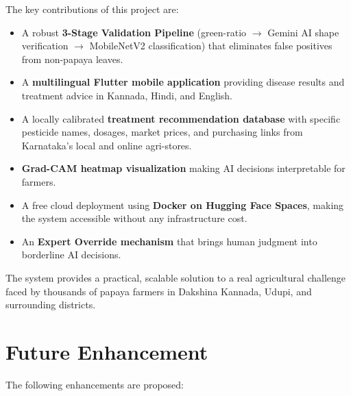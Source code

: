 \documentclass[12pt,a4paper]{report}
\begin{document}
The key contributions of this project are:
\begin{itemize}
    \item A robust \textbf{3-Stage Validation Pipeline} (green-ratio $\rightarrow$ Gemini AI shape verification $\rightarrow$ MobileNetV2 classification) that eliminates false positives from non-papaya leaves.
    \item A \textbf{multilingual Flutter mobile application} providing disease results and treatment advice in Kannada, Hindi, and English.
    \item A locally calibrated \textbf{treatment recommendation database} with specific pesticide names, dosages, market prices, and purchasing links from Karnataka's local and online agri-stores.
    \item \textbf{Grad-CAM heatmap visualization} making AI decisions interpretable for farmers.
    \item A free cloud deployment using \textbf{Docker on Hugging Face Spaces}, making the system accessible without any infrastructure cost.
    \item An \textbf{Expert Override mechanism} that brings human judgment into borderline AI decisions.
\end{itemize}

The system provides a practical, scalable solution to a real agricultural challenge faced by thousands of papaya farmers in Dakshina Kannada, Udupi, and surrounding districts.

\section{Future Enhancement}
The following enhancements are proposed:
\end{document}
